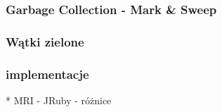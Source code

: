 \begin{frame}[fragile]
\frametitle{Garbage Collection - Mark \& Sweep}
\end{frame}

\begin{frame}[fragile]
\frametitle{Wątki zielone}
\end{frame}

\begin{frame}[fragile]
\frametitle{implementacje}
    * MRI
    - JRuby - różnice
\end{frame}
